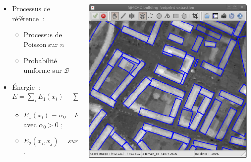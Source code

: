 \documentclass{beamer}
\begin{document}
\begin{frame}
\begin{columns}
\begin{column}{0.55\textwidth}
\begin{itemize}
\item Processus de référence~:
\begin{itemize}
\item Processus de Poisson sur $n$
\item Probabilité uniforme sur $\mathcal{B}$
\end{itemize}
\item \'Energie~: $E = \sum_i E_1(x_i) + \sum_{i<j} E_2(x_i,x_j)$
\begin{itemize}
\item $E_1(x_i)=\alpha_{0} - E_{data}(x_i)$ avec $\alpha_{0}>0$ ;
\item $E_2(x_i,x_j) = surface(x_i \cap x_j)$.
\end{itemize}
\end{itemize}
\end{column}
\begin{column}{0.45\textwidth}
 \includegraphics[width=\textwidth]{configuration}
\end{column}
\end{columns}
\end{frame}
\end{document}
